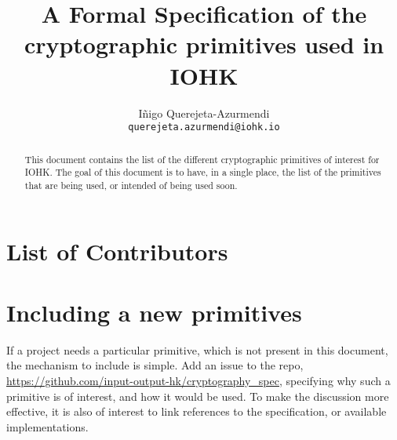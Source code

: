 \cleardoublepage%
  \tableofcontents%

  \listoffigures%
  \clearpage%

\title{A Formal Specification of the cryptographic primitives used in IOHK}

\author{I\~{n}igo Querejeta-Azurmendi  \\ {\small \texttt{querejeta.azurmendi@iohk.io}}}


\maketitle

\begin{abstract}
This document contains the list of the different cryptographic primitives of interest for IOHK. The 
goal of this document is to have, in a single place, the list of the primitives that are being used, 
or intended of being used soon. 
\end{abstract}

\section*{List of Contributors}

\section*{Including a new primitives}
If a project needs a particular primitive, which is not present in this document, the mechanism 
to include is simple. Add an issue to the repo, 
\url{https://github.com/input-output-hk/cryptography_spec}, specifying why such a 
primitive is of interest, and how it would be used. To make the discussion more effective, 
it is also of interest to link references to the specification, or available implementations. 
\label{acknowledgements}
